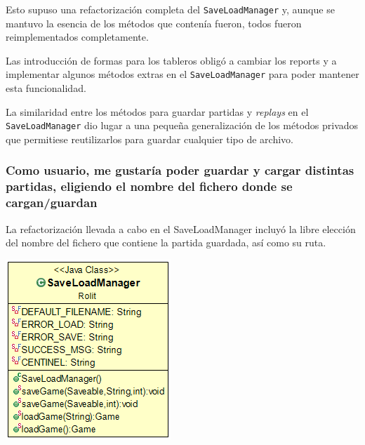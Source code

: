 \documentclass[../DocumentoOficial.tex]{subfiles}
\begin{document}
\begin{sprint}[3]
Esto supuso una refactorización completa del \texttt{SaveLoadManager} y, aunque se mantuvo la esencia de los métodos que contenía fueron, todos fueron reimplementados completamente.

\end{sprint}

\begin{sprint}[4]
Las introducción de formas para los tableros obligó a cambiar los reports y a implementar algunos métodos extras en el \texttt{SaveLoadManager} para poder mantener esta funcionalidad.
\end{sprint}

\begin{sprint}[6]
La similaridad entre los métodos para guardar partidas y \textit{replays} en el \texttt{SaveLoadManager} dio lugar a una pequeña generalización de los métodos privados que permitiese reutilizarlos para guardar cualquier tipo de archivo.
\end{sprint}

\subsubsection{Como usuario, me gustaría poder guardar y cargar distintas partidas, eligiendo el nombre del fichero donde se cargan/guardan}
\begin{sprint}[2]
La refactorización llevada a cabo en el SaveLoadManager incluyó la libre elección del nombre del fichero que contiene la partida guardada, así como su ruta.

\begin{center}
\centering
\includegraphics[scale=0.5]{save-load-manager-sprint2.png}
\end{center}

\end{sprint}
\end{document}
